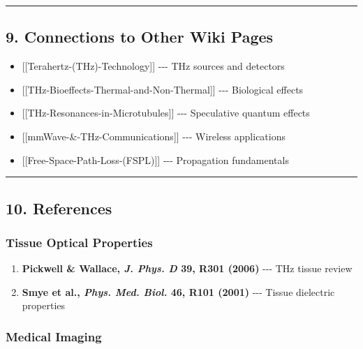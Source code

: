 \begin{center}\rule{0.5\linewidth}{0.5pt}\end{center}

\subsection{9. Connections to Other Wiki
Pages}\label{connections-to-other-wiki-pages}

\begin{itemize}
\tightlist
\item
  {[}{[}Terahertz-(THz)-Technology{]}{]} -\/-\/- THz sources and
  detectors
\item
  {[}{[}THz-Bioeffects-Thermal-and-Non-Thermal{]}{]} -\/-\/- Biological
  effects
\item
  {[}{[}THz-Resonances-in-Microtubules{]}{]} -\/-\/- Speculative quantum
  effects
\item
  {[}{[}mmWave-\&-THz-Communications{]}{]} -\/-\/- Wireless applications
\item
  {[}{[}Free-Space-Path-Loss-(FSPL){]}{]} -\/-\/- Propagation
  fundamentals
\end{itemize}

\begin{center}\rule{0.5\linewidth}{0.5pt}\end{center}

\subsection{10. References}\label{references}

\subsubsection{Tissue Optical
Properties}\label{tissue-optical-properties}

\begin{enumerate}
\def\labelenumi{\arabic{enumi}.}
\tightlist
\item
  \textbf{Pickwell \& Wallace, \emph{J. Phys. D} 39, R301 (2006)}
  -\/-\/- THz tissue review
\item
  \textbf{Smye et al., \emph{Phys. Med. Biol.} 46, R101 (2001)} -\/-\/-
  Tissue dielectric properties
\end{enumerate}

\subsubsection{Medical Imaging}\label{medical-imaging}

